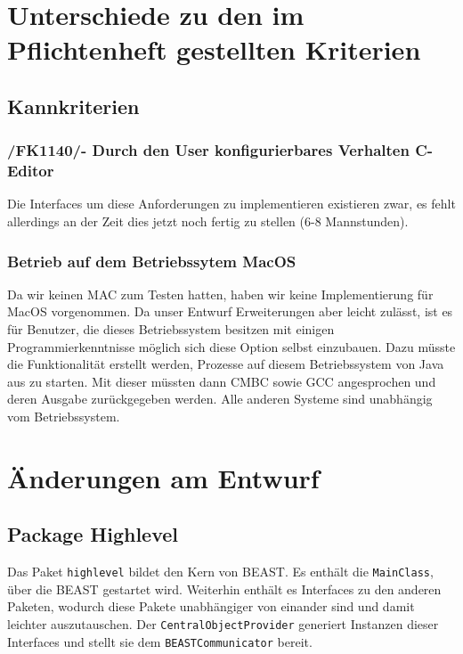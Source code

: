 \documentclass[a4paper]{scrreprt}
\begin{document}
\chapter{Unterschiede zu den im Pflichtenheft gestellten Kriterien}

\section{Kannkriterien}

\subsection{/FK1140/- Durch den User konfigurierbares Verhalten C-Editor}
Die Interfaces um diese Anforderungen zu implementieren existieren zwar, es fehlt allerdings an der Zeit dies jetzt noch fertig zu stellen (6-8 Mannstunden).

\subsection{Betrieb auf dem Betriebssytem MacOS} 
Da wir keinen MAC zum Testen hatten, haben wir keine Implementierung für MacOS
vorgenommen. Da unser Entwurf Erweiterungen aber leicht zulässt, ist es für
Benutzer, die dieses Betriebssystem besitzen mit einigen Programmierkenntnisse
möglich sich diese Option selbst einzubauen. Dazu müsste die Funktionalität erstellt werden, Prozesse auf diesem Betriebssystem von Java aus zu starten. Mit dieser müssten dann CMBC sowie GCC angesprochen und deren Ausgabe zurückgegeben werden. Alle anderen Systeme sind unabhängig vom Betriebssystem.

\chapter{Änderungen am Entwurf}
\section{Package Highlevel}

Das Paket \verb!highlevel! bildet den Kern von BEAST. Es enthält die \verb!MainClass!, über die BEAST gestartet wird. Weiterhin enthält es Interfaces zu den anderen Paketen, wodurch diese Pakete unabhängiger von einander sind und damit leichter auszutauschen. Der \verb!CentralObjectProvider! generiert Instanzen dieser Interfaces und stellt sie dem \verb!BEASTCommunicator! bereit. \\
\end{document}
